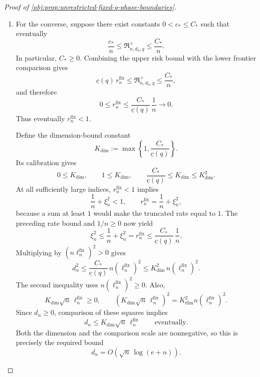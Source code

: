 \documentclass[11pt]{article}
\begin{document}
\begin{proof}[Proof of \cref{obj:prop:unrestricted-fixed-q-phase-boundaries}]
\begin{enumerate}
\item For the converse, suppose there exist constants \(0<c_*\le C_*\) such that eventually
\[
\frac{c_*}{n}
\le\mathfrak R^{+}_{n,d_n,q}
\le\frac{C_*}{n}.
\]
In particular, \(C_*\ge0\). Combining the upper risk bound with the lower frontier comparison gives
\[
\underline c(q)\,r_n^{\mathrm{fix}}
\le\mathfrak R^{+}_{n,d_n,q}
\le\frac{C_*}{n},
\]
and therefore
\[
0\le r_n^{\mathrm{fix}}
\le\frac{C_*}{\underline c(q)}\,\frac1n
\longrightarrow0.
\]
Thus eventually \(r_n^{\mathrm{fix}}<1\).

Define the dimension-bound constant
\[
K_{\mathrm{dim}}
:=\max\left\{1,\frac{C_*}{\underline c(q)}\right\}.
\]
Its calibration gives
\[
0\le K_{\mathrm{dim}},
\qquad
1\le K_{\mathrm{dim}},
\qquad
\frac{C_*}{\underline c(q)}
\le K_{\mathrm{dim}}
\le K_{\mathrm{dim}}^2.
\]
At all sufficiently large indices, \(r_n^{\mathrm{fix}}<1\) implies
\[
\frac1n+\xi_n^2<1,
\qquad
r_n^{\mathrm{fix}}=\frac1n+\xi_n^2,
\]
because a sum at least \(1\) would make the truncated rate equal to \(1\).
The preceding rate bound and \(1/n\ge0\) now yield
\[
\xi_n^2
\le\frac1n+\xi_n^2
=r_n^{\mathrm{fix}}
\le\frac{C_*}{\underline c(q)}\,\frac1n.
\]
Multiplying by \((n\ell_n^{\mathrm{fix}})^2>0\) gives
\[
d_n^2
\le\frac{C_*}{\underline c(q)}
\,n\left(\ell_n^{\mathrm{fix}}\right)^2
\le K_{\mathrm{dim}}^2
\,n\left(\ell_n^{\mathrm{fix}}\right)^2.
\]
The second inequality uses
\(n(\ell_n^{\mathrm{fix}})^2\ge0\). Also,
\[
K_{\mathrm{dim}}\sqrt n\,\ell_n^{\mathrm{fix}}\ge0,
\qquad
\left(K_{\mathrm{dim}}\sqrt n\,\ell_n^{\mathrm{fix}}\right)^2
=K_{\mathrm{dim}}^2n\left(\ell_n^{\mathrm{fix}}\right)^2.
\]
Since \(d_n\ge0\), comparison of these squares implies
\[
d_n\le K_{\mathrm{dim}}\sqrt n\,\ell_n^{\mathrm{fix}}
\qquad\text{eventually}.
\]
Both the dimension and the comparison scale are nonnegative, so this is precisely the required bound
\[
d_n=O\!\left(\sqrt n\,\log(e+n)\right).
\]
\end{enumerate}
\end{proof}
\end{document}
